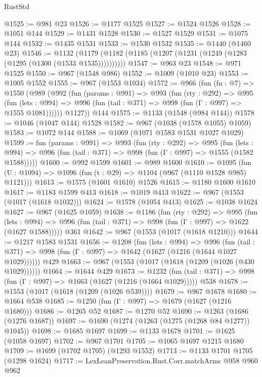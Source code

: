 \begin{lexlean}{RustStd}
\begin{coremodule}
@1525 := @981 @23
@1526 := @1177 @1525
@1527 := @1524 @1526
@1528 := @1051 @144
@1529 := @1431 @1528
@1530 := @1527 @1529
@1531 := @1075 @144
@1532 := @1435 @1531
@1533 := @1530 @1532
@1535 := @1440 (@1460 @23)
@1546 := @1132 (@1179 (@1182 (@1185 (@1207 (@1231 (@1249 (@1283 (@1295 (@1300 (@1533 @1535))))))))))
@1547 := @963 @23
@1548 := @971 @1525
@1550 := @967 (@1548 @986)
@1552 := @1009 (@1010 @23)
@1553 := @1005 @1552
@1555 := @967 (@1553 @1034)
@1572 := @966
    (fun (fn : @7) =>
    @1550
      (@989
        (@992
          (fun (params : @991) =>
          @993
            (fun (rty : @292) =>
            @995
              (fun (lets : @994) =>
              @996 (fun (tail : @371) => @998 (fun (Γ : @997) => @1555 @1081))))))
        @1127))
    @144
@1575 := @1133 (@1548 (@984 @144))
@1578 := @1046 (@1047 @144) @1528
@1582 := @967 (@1038 (@1578 @1055) @1059)
@1583 := @1072 @144
@1588 := @1069 (@1071 @1583 @1531 @1027 @1029)
@1599 := fun (params : @991) =>
  @993
    (fun (rty : @292) =>
    @995
      (fun (lets : @994) =>
      @996 (fun (tail : @371) => @998 (fun (Γ : @997) => @1555 (@1582 @1588)))))
@1600 := @992 @1599
@1601 := @989 @1600
@1610 := @1095 (fun (U : @1094) => @1096 (fun (t : @29) => @1104 (@967 (@1110 @1528 @985) @1121)))
@1613 := @1575 (@1601 @1610) @1526
@1615 := @1180 @1600 @1610
@1617 := @1183 @1599 @413
@1618 := @1019 @413
@1622 := @967 (@1553 (@1017 (@1618 @1032)))
@1624 := @1578 (@1054 @413)
@1625 := @1038 @1624
@1627 := @967 (@1625 @1059)
@1638 := @1186
    (fun (rty : @292) =>
    @995
      (fun (lets : @994) =>
      @996 (fun (tail : @371) => @998 (fun (Γ : @997) => @1622 (@1627 @1588)))))
    @361
@1642 := @967 (@1553 (@1017 (@1618 @1210)))
@1644 := @1217 @1583 @1531
@1656 := @1208
    (fun (lets : @994) =>
    @996 (fun (tail : @371) => @998 (fun (Γ : @997) => @1642 (@1627 (@1216 (@1644 @1027 @1029))))))
    @429
@1663 := @967 (@1553 (@1017 (@1618 (@1209 (@1026 (@430 @1029))))))
@1664 := @1644 @429
@1673 := @1232
    (fun (tail : @371) => @998 (fun (Γ : @997) => @1663 (@1627 (@1216 (@1664 @1029)))))
    @538
@1678 := @1553 (@1017 (@1618 (@1209 (@1026 @539))))
@1679 := @967 @1678
@1680 := @1664 @538
@1685 := @1250 (fun (Γ : @997) => @1679 (@1627 (@1216 @1680)))
@1686 := @1265 @52
@1687 := @1270 @52
@1690 := @1263 (@1686 (@1276 @1687))
@1697 := @1690 (@1274 (@1263 (@1275 (@1268 @84 @1277)) @1045))
@1698 := @1685 @1697
@1699 := @1133 @1678
@1701 := @1625 (@1058 @1697)
@1702 := @967 @1701
@1705 := @1065 @1697 @1215 @1680
@1709 := @1699 (@1702 @1705) (@1293 @1552)
@1713 := @1133 @1701 @1705 (@1298 @1624)
@1717 := LexLeanPreservation.Rust.Corr.matchArms @958 @960 @962

\end{coremodule}
\end{lexlean}
